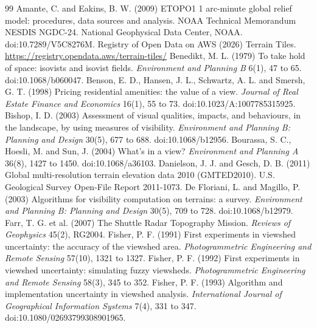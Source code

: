 \documentclass[11pt,a4paper]{article}
\begin{document}

\begin{thebibliography}{99}\small
{} Amante, C. and Eakins, B. W. (2009) ETOPO1 1 arc-minute global relief model: procedures, data sources and analysis. NOAA Technical Memorandum NESDIS NGDC-24. National Geophysical Data Center, NOAA. doi:10.7289/V5C8276M.
 Registry of Open Data on AWS (2026) Terrain Tiles. \url{https://registry.opendata.aws/terrain-tiles/}
 Benedikt, M. L. (1979) To take hold of space: isovists and isovist fields. \textit{Environment and Planning B} 6(1), 47 to 65. doi:10.1068/b060047.
 Benson, E. D., Hansen, J. L., Schwartz, A. L. and Smersh, G. T. (1998) Pricing residential amenities: the value of a view. \textit{Journal of Real Estate Finance and Economics} 16(1), 55 to 73. doi:10.1023/A:1007785315925.
 Bishop, I. D. (2003) Assessment of visual qualities, impacts, and behaviours, in the landscape, by using measures of visibility. \textit{Environment and Planning B: Planning and Design} 30(5), 677 to 688. doi:10.1068/b12956.
 Bourassa, S. C., Hoesli, M. and Sun, J. (2004) What's in a view? \textit{Environment and Planning A} 36(8), 1427 to 1450. doi:10.1068/a36103.
 Danielson, J. J. and Gesch, D. B. (2011) Global multi-resolution terrain elevation data 2010 (GMTED2010). U.S. Geological Survey Open-File Report 2011-1073.
 De Floriani, L. and Magillo, P. (2003) Algorithms for visibility computation on terrains: a survey. \textit{Environment and Planning B: Planning and Design} 30(5), 709 to 728. doi:10.1068/b12979.
 Farr, T. G. et al. (2007) The Shuttle Radar Topography Mission. \textit{Reviews of Geophysics} 45(2), RG2004.
 Fisher, P. F. (1991) First experiments in viewshed uncertainty: the accuracy of the viewshed area. \textit{Photogrammetric Engineering and Remote Sensing} 57(10), 1321 to 1327.
 Fisher, P. F. (1992) First experiments in viewshed uncertainty: simulating fuzzy viewsheds. \textit{Photogrammetric Engineering and Remote Sensing} 58(3), 345 to 352.
 Fisher, P. F. (1993) Algorithm and implementation uncertainty in viewshed analysis. \textit{International Journal of Geographical Information Systems} 7(4), 331 to 347. doi:10.1080/02693799308901965.

\end{thebibliography}
\end{document}
